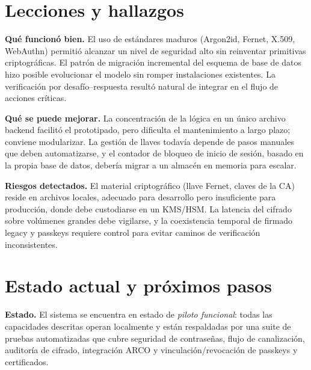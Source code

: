 \documentclass[10pt,letterpaper]{report}
\begin{document}
\section{Lecciones y hallazgos}

\textbf{Qué funcionó bien.} El uso de estándares maduros (Argon2id, Fernet,
X.509, WebAuthn) permitió alcanzar un nivel de seguridad alto sin reinventar
primitivas criptográficas. El patrón de migración incremental del esquema de
base de datos hizo posible evolucionar el modelo sin romper instalaciones
existentes. La verificación por desafío--respuesta resultó natural de integrar
en el flujo de acciones críticas.

\textbf{Qué se puede mejorar.} La concentración de la lógica en un único archivo
backend facilitó el prototipado, pero dificulta el mantenimiento a largo plazo;
conviene modularizar. La gestión de llaves todavía depende de pasos manuales que
deben automatizarse, y el contador de bloqueo de inicio de sesión, basado en la
propia base de datos, debería migrar a un almacén en memoria para escalar.

\textbf{Riesgos detectados.} El material criptográfico (llave Fernet, claves de
la CA) reside en archivos locales, adecuado para desarrollo pero insuficiente
para producción, donde debe custodiarse en un KMS/HSM. La latencia del cifrado
sobre volúmenes grandes debe vigilarse, y la coexistencia temporal de firmado
legacy y passkeys requiere control para evitar caminos de verificación
inconsistentes.

\section{Estado actual y próximos pasos}

\textbf{Estado.} El sistema se encuentra en estado de \emph{piloto funcional}:
todas las capacidades descritas operan localmente y están respaldadas por una
suite de pruebas automatizadas que cubre seguridad de contraseñas, flujo de
canalización, auditoría de cifrado, integración ARCO y vinculación/revocación de
passkeys y certificados.
\end{document}
